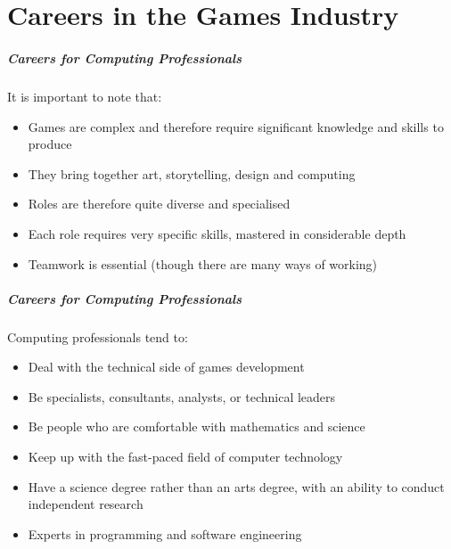 \part{Careers in the Games Industry}
\frame{\partpage}

\begin{frame}
	\frametitle{Careers for Computing Professionals}
	
	It is important to note that:
	
	\begin{itemize}
		\item Games are complex and therefore require significant knowledge and skills to produce \pause
		\item They bring together art, storytelling, design and computing \pause
		\item Roles are therefore quite diverse and specialised \pause
		\item Each role requires very specific skills, mastered in considerable depth \pause
		\item Teamwork is essential (though there are many ways of working)
	\end{itemize}
\end{frame}

\begin{frame}
	\frametitle{Careers for Computing Professionals}
	
	Computing professionals tend to:
	
	\begin{itemize}
		\item Deal with the technical side of games development \pause
		\item Be specialists, consultants, analysts, or technical leaders \pause
		\item Be people who are comfortable with mathematics and science \pause
		\item Keep up with the fast-paced field of computer technology \pause
		\item Have a science degree rather than an arts degree, with an ability to conduct independent research
		\item Experts in programming and software engineering
	\end{itemize}
\end{frame}

